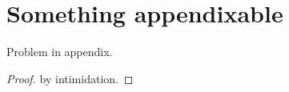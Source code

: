 \chapter{Something appendixable}

\begin{theoremApp}
	Problem in appendix.
\end{theoremApp}
\begin{proof}
	by intimidation.
\end{proof}